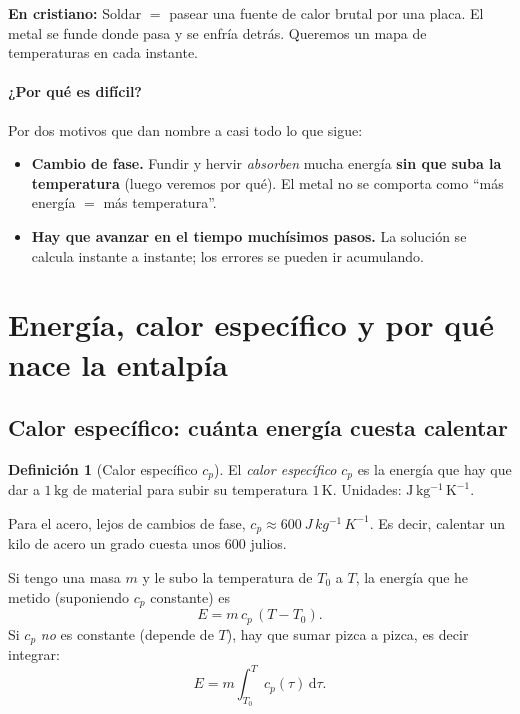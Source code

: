 \documentclass[11pt]{article}
\newcommand{\dd}{\mathrm{d}}
\theoremstyle{definition}
\newtheorem{definicion}{Definición}[section]
\theoremstyle{plain}
\newcommand{\dummies}[1]{%
  \par\smallskip\noindent
  \colorbox{yellow!18}{\parbox{\dimexpr\linewidth-2\fboxsep}{%
  \small\textbf{En cristiano:} #1}}\par\smallskip}
\begin{document}
\dummies{Soldar $=$ pasear una fuente de calor brutal por una placa. El metal se
funde donde pasa y se enfría detrás. Queremos un mapa de temperaturas en cada
instante.}

\paragraph{¿Por qué es difícil?} Por dos motivos que dan nombre a casi todo lo que
sigue:
\begin{itemize}[leftmargin=1.5em]
  \item \textbf{Cambio de fase.} Fundir y hervir \emph{absorben} mucha energía
  \textbf{sin que suba la temperatura} (luego veremos por qué). El metal no se
  comporta como ``más energía $=$ más temperatura''.
  \item \textbf{Hay que avanzar en el tiempo muchísimos pasos.} La solución se
  calcula instante a instante; los errores se pueden ir acumulando.
\end{itemize}

\section{Energía, calor específico y por qué nace la entalpía}
\label{sec:cp}

\subsection{Calor específico: cuánta energía cuesta calentar}

\begin{definicion}[Calor específico $c_p$]
El \emph{calor específico} $c_p$ es la energía que hay que dar a $1\,\mathrm{kg}$ de
material para subir su temperatura $1\,\mathrm{K}$. Unidades:
$\mathrm{J\,kg^{-1}\,K^{-1}}$.
\end{definicion}

Para el acero, lejos de cambios de fase, $c_p \approx \SI{600}{J\,kg^{-1}\,K^{-1}}$.
Es decir, calentar un kilo de acero un grado cuesta unos 600 julios.

Si tengo una masa $m$ y le subo la temperatura de $T_0$ a $T$, la energía que he
metido (suponiendo $c_p$ constante) es
\begin{equation}
  E = m\,c_p\,(T-T_0).
  \label{eq:Esimple}
\end{equation}
Si $c_p$ \emph{no} es constante (depende de $T$), hay que sumar pizca a pizca, es
decir integrar:
\begin{equation}
  E = m\int_{T_0}^{T} c_p(\tau)\,\dd\tau .
  \label{eq:Eint}
\end{equation}
\end{document}
